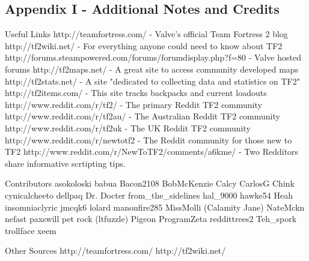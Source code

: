 \subsection{Appendix I - Additional Notes and Credits}
 
Useful Links
http://teamfortress.com/ - Valve's official Team Fortress 2 blog
http://tf2wiki.net/ - For everything anyone could need to know about TF2
http://forums.steampowered.com/forums/forumdisplay.php?f=80 - Valve hosted forums 
http://tf2maps.net/ - A great site to access community developed maps
http://tf2stats.net/ - A site "dedicated to collecting data and statistics on TF2"
http://tf2items.com/ - This site tracks backpacks and current loadouts
http://www.reddit.com/r/tf2/ - The primary Reddit TF2 community
http://www.reddit.com/r/tf2au/ - The Australian Reddit TF2 community
http://www.reddit.com/r/tf2uk - The UK Reddit TF2 community
http://www.reddit.com/r/newtotf2 - The Reddit community for those new to TF2
http://www.reddit.com/r/NewToTF2/comments/a6kme/ - Two Redditors share informative scrtipting tips.

Contributors
asokoloski
babua
Bacon2108
BobMcKenzie
Calcy
CarlosG
Chink
cynicalcheeto
dellpaq
Dr. Docter
from\_the\_sidelines
hal\_9000
hawke54
Heah
insomniaclyric
jmcqk6
lolard
manonfire285
MissMolli (Calamity Jane)
NateMckn
nefast
paxswill
pet rock (ltfuzzle)
Pigeon
ProgramZeta
reddittrees2
Teh\_spork
trollface
xeem

 
Other Sources
http://teamfortress.com/
http://tf2wiki.net/